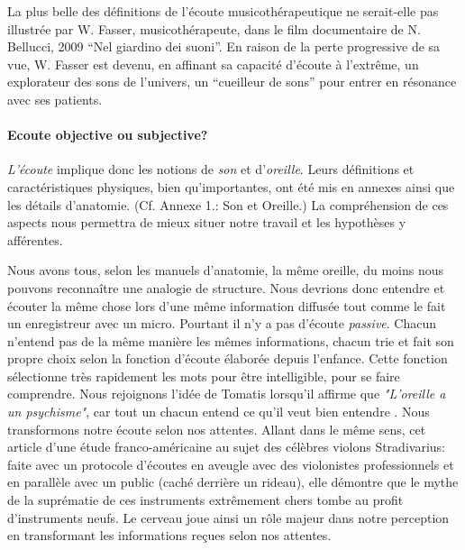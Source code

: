 La plus belle des définitions de l'écoute musicothérapeutique ne serait-elle pas illustrée par W. 
Fasser, musicothérapeute,  dans le film documentaire de N. Bellucci, 2009 \enquote{Nel giardino dei 
suoni}.  
En raison de la perte progressive de sa vue, 
W. Fasser est devenu, en affinant sa capacité d'écoute à l'extrême, un explorateur des sons de l'univers,  
un 
 \enquote{cueilleur de sons} pour entrer en résonance avec ses patients. 






\paragraph{Ecoute objective ou subjective?}

\emph{L'écoute} implique donc les notions de \emph{son} et
d'\emph{oreille}. Leurs définitions et caractéristiques physiques, bien qu'importantes, ont été mis en
annexes ainsi que les détails
d'anatomie. (Cf. Annexe 1.: Son et Oreille.)
La compréhension de ces aspects nous
permettra de mieux situer notre travail et les hypothèses y afférentes.


Nous avons tous,
selon les manuels d'anatomie, la même
oreille, du moins nous pouvons reconnaître une analogie de structure. Nous devrions donc entendre et écouter la même chose
lors d'une même information diffusée tout comme le fait un enregistreur avec un micro. Pourtant il n'y a pas d'écoute \emph{passive}. Chacun n'entend pas de la même manière les mêmes
informations, chacun trie et fait son propre choix selon la fonction
d'écoute élaborée depuis l'enfance. Cette fonction sélectionne très
rapidement les mots pour être intelligible, pour se faire
comprendre. Nous rejoignons l'idée de Tomatis lorsqu'il affirme que
\textit{"L'oreille a un psychisme"}, car tout un chacun entend ce qu'il veut bien
entendre \autocite [167]{tomatis_oreille_1987}.
Nous transformons notre écoute selon nos attentes.
Allant dans le même sens, cet
article d'une
étude franco-américaine \autocite{lemonde.fr:stradivarius} au sujet des célèbres violons
Stradivarius: faite avec un protocole
d'écoutes en aveugle avec
des violonistes professionnels et en parallèle avec un public (caché
derrière un rideau), elle démontre que le mythe de la suprématie
de ces instruments extrêmement chers tombe au profit d'instruments
neufs. Le cerveau  joue ainsi un
rôle majeur dans notre perception en 
transformant les informations reçues selon nos attentes.
%
